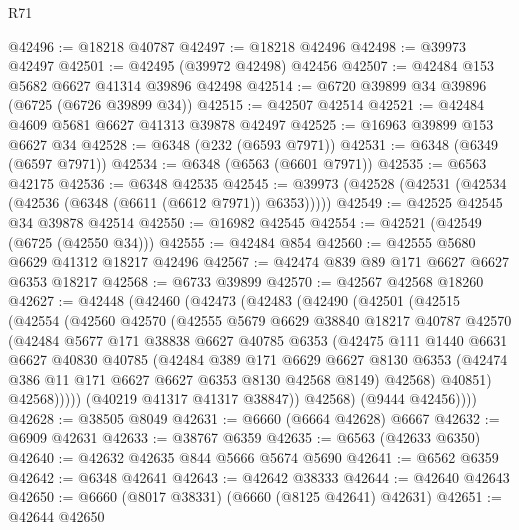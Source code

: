 \begin{lexlean}{R71}
\begin{coremodule}
@42496 := @18218 @40787
@42497 := @18218 @42496
@42498 := @39973 @42497
@42501 := @42495 (@39972 @42498) @42456
@42507 := @42484 @153 @5682 @6627 @41314 @39896 @42498
@42514 := @6720 @39899 @34 @39896 (@6725 (@6726 @39899 @34))
@42515 := @42507 @42514
@42521 := @42484 @4609 @5681 @6627 @41313 @39878 @42497
@42525 := @16963 @39899 @153 @6627 @34
@42528 := @6348 (@232 (@6593 @7971))
@42531 := @6348 (@6349 (@6597 @7971))
@42534 := @6348 (@6563 (@6601 @7971))
@42535 := @6563 @42175
@42536 := @6348 @42535
@42545 := @39973 (@42528 (@42531 (@42534 (@42536 (@6348 (@6611 (@6612 @7971)) @6353)))))
@42549 := @42525 @42545 @34 @39878 @42514
@42550 := @16982 @42545
@42554 := @42521 (@42549 (@6725 (@42550 @34)))
@42555 := @42484 @854
@42560 := @42555 @5680 @6629 @41312 @18217 @42496
@42567 := @42474 @839 @89 @171 @6627 @6627 @6353 @18217
@42568 := @6733 @39899
@42570 := @42567 @42568 @18260
@42627 := @42448
    (@42460
      (@42473
        (@42483
          (@42490
            (@42501
              (@42515
                (@42554
                  (@42560
                    @42570
                    (@42555
                      @5679
                      @6629
                      @38840
                      @18217
                      @40787
                      @42570
                      (@42484
                        @5677
                        @171
                        @38838
                        @6627
                        @40785
                        @6353
                        (@42475
                          @111
                          @1440
                          @6631
                          @6627
                          @40830
                          @40785
                          (@42484
                            @389
                            @171
                            @6629
                            @6627
                            @8130
                            @6353
                            (@42474 @386 @11 @171 @6627 @6627 @6353 @8130 @42568 @8149)
                            @42568)
                          @40851)
                        @42568)))))
              (@40219 @41317 @41317 @38847))
            @42568)
          (@9444 @42456))))
@42628 := @38505 @8049
@42631 := @6660 (@6664 @42628) @6667
@42632 := @6909 @42631
@42633 := @38767 @6359
@42635 := @6563 (@42633 @6350)
@42640 := @42632 @42635 @844 @5666 @5674 @5690
@42641 := @6562 @6359
@42642 := @6348 @42641
@42643 := @42642 @38333
@42644 := @42640 @42643
@42650 := @6660 (@8017 @38331) (@6660 (@8125 @42641) @42631)
@42651 := @42644 @42650

\end{coremodule}
\end{lexlean}
